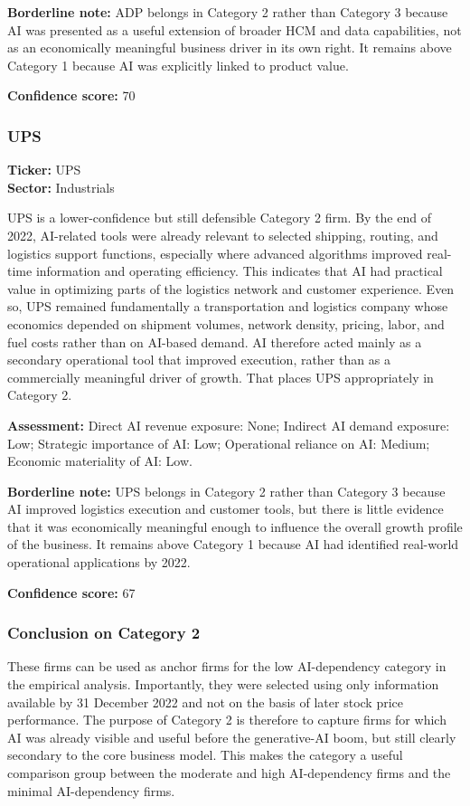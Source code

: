 \documentclass{article}
\begin{document}
\textbf{Borderline note:} ADP belongs in Category 2 rather than Category 3 because AI was presented as a useful extension of broader HCM and data capabilities, not as an economically meaningful business driver in its own right. It remains above Category 1 because AI was explicitly linked to product value.

\textbf{Confidence score:} 70

\subsubsection*{UPS}
\textbf{Ticker:} UPS \\
\textbf{Sector:} Industrials

UPS is a lower-confidence but still defensible Category 2 firm. By the end of 2022, AI-related tools were already relevant to selected shipping, routing, and logistics support functions, especially where advanced algorithms improved real-time information and operating efficiency. This indicates that AI had practical value in optimizing parts of the logistics network and customer experience. Even so, UPS remained fundamentally a transportation and logistics company whose economics depended on shipment volumes, network density, pricing, labor, and fuel costs rather than on AI-based demand. AI therefore acted mainly as a secondary operational tool that improved execution, rather than as a commercially meaningful driver of growth. That places UPS appropriately in Category 2.

\textbf{Assessment:} Direct AI revenue exposure: None; Indirect AI demand exposure: Low; Strategic importance of AI: Low; Operational reliance on AI: Medium; Economic materiality of AI: Low.

\textbf{Borderline note:} UPS belongs in Category 2 rather than Category 3 because AI improved logistics execution and customer tools, but there is little evidence that it was economically meaningful enough to influence the overall growth profile of the business. It remains above Category 1 because AI had identified real-world operational applications by 2022.

\textbf{Confidence score:} 67

\subsubsection*{Conclusion on Category 2}

These firms can be used as anchor firms for the low AI-dependency category in the empirical analysis. Importantly, they were selected using only information available by 31 December 2022 and not on the basis of later stock price performance. The purpose of Category 2 is therefore to capture firms for which AI was already visible and useful before the generative-AI boom, but still clearly secondary to the core business model. This makes the category a useful comparison group between the moderate and high AI-dependency firms and the minimal AI-dependency firms.
\end{document}
